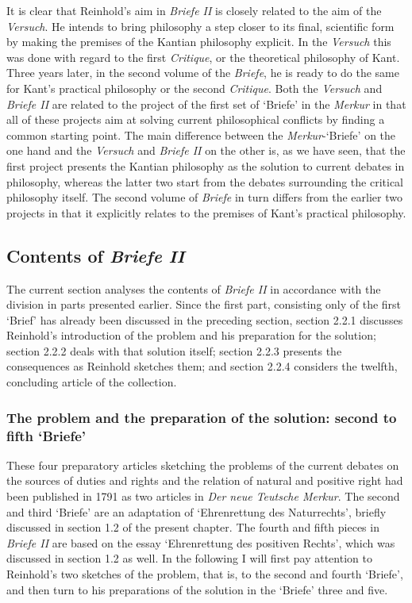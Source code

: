  It is clear that Reinhold's aim in \textit{Briefe II} is closely related to the aim of the \textit{Versuch}. He intends to bring philosophy a step closer to its final, scientific form by making the premises of the Kantian philosophy explicit. In the \textit{Versuch} this was done with regard to the first \textit{Critique}, or the theoretical philosophy of Kant. Three years later, in the second volume of the \textit{Briefe}, he is ready to do the same for Kant's practical philosophy or the second \textit{Critique}. Both the \textit{Versuch} and \textit{Briefe II} are related to the project of the first set of `Briefe' in the \textit{Merkur} in that all of these projects aim at solving current philosophical conflicts by finding a common starting point. The main difference between the \textit{Merkur}{-}`Briefe' on the one hand and the \textit{Versuch }and \textit{Briefe II} on the other is, as we have seen, that the first project presents the Kantian philosophy as the solution to current debates in philosophy, whereas the latter two start from the debates surrounding the critical philosophy itself. The second volume of \textit{Briefe} in turn differs from the earlier two projects in that it explicitly relates to the premises of Kant's practical philosophy. 


\subsection{Contents of \textit{Briefe II}}


The current section analyses the contents of \textit{Briefe II} in accordance with the division in parts presented earlier. Since the first part, consisting only of the first `Brief' has already been discussed in the preceding section, section 2.2.1 discusses Reinhold's introduction of the problem and his preparation for the solution; section 2.2.2 deals with that solution itself; section 2.2.3 presents the consequences as Reinhold sketches them; and section 2.2.4 considers the twelfth, concluding article of the collection.


\subsubsection{The problem and the preparation of the solution: second to fifth `Briefe'}


These four preparatory articles sketching the problems of the current debates on the sources of duties and rights and the relation of natural and positive right had been published in 1791 as two articles in \textit{Der neue Teutsche Merkur}. The second and third `Briefe' are an adaptation of `Ehrenrettung des Naturrechts', briefly discussed in section 1.2 of the present chapter. The fourth and fifth pieces in \textit{Briefe II} are based on the essay `Ehrenrettung des positiven Rechts', which was discussed in section 1.2 as well. In the following I will first pay attention to Reinhold's two sketches of the problem, that is, to the second and fourth `Briefe', and then turn to his preparations of the solution in the `Briefe' three and five.

